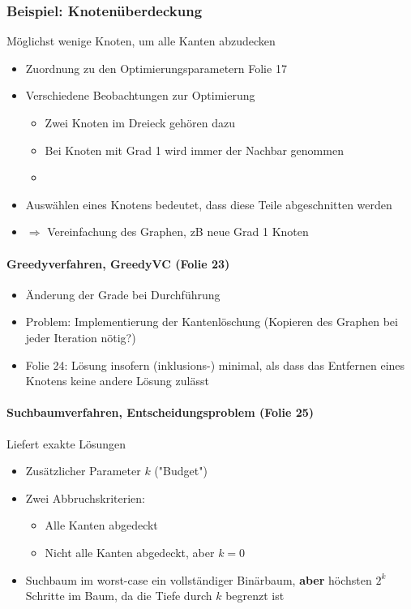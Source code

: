 \documentclass[ngerman]{scrartcl}
\begin{document}
\subsubsection{Beispiel: Knotenüberdeckung}
Möglichst wenige Knoten, um alle Kanten abzudecken
\begin{itemize}
  \item Zuordnung zu den Optimierungsparametern Folie 17
  \item Verschiedene Beobachtungen zur Optimierung
  \begin{itemize}
    \item Zwei Knoten im Dreieck gehören dazu
    \item Bei Knoten mit Grad 1 wird immer der Nachbar genommen
    \item 
  \end{itemize}
  \item Auswählen eines Knotens bedeutet, dass diese Teile abgeschnitten werden
  \item $\Rightarrow$ Vereinfachung des Graphen, zB neue Grad 1 Knoten
\end{itemize}

\paragraph*{Greedyverfahren, GreedyVC (Folie 23)}
\begin{itemize}
  \item Änderung der Grade bei Durchführung
  \item Problem: Implementierung der Kantenlöschung (Kopieren des Graphen bei jeder Iteration nötig?)
  \item Folie 24: Lösung insofern (inklusions-) minimal, als dass das Entfernen eines Knotens keine andere Lösung zulässt
\end{itemize}

\paragraph*{Suchbaumverfahren, Entscheidungsproblem (Folie 25)}
Liefert exakte Lösungen
\begin{itemize}
  \item Zusätzlicher Parameter $ k $ ("Budget")
  \item Zwei Abbruchskriterien:
  \begin{itemize}
    \item Alle Kanten abgedeckt
    \item Nicht alle Kanten abgedeckt, aber $ k=0 $
  \end{itemize}
  \item Suchbaum im worst-case ein vollständiger Binärbaum, \textbf{aber} höchsten $ 2^{k} $ Schritte im Baum, da die Tiefe durch $ k $ begrenzt ist
\end{itemize}
\end{document}
